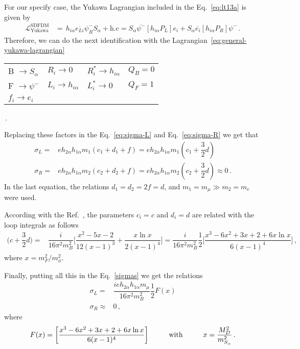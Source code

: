 For our specify case, the Yukawa Lagrangian included in the Eq.~\ref{eq:lt13a} is given by
\begin{align}
\mathcal{L}_{\text{Yukawa}}^{\text{SDFDM}}&=\, h_{i\alpha}\overline{e_{Li}}\psi^-_{R}S_\alpha+ \text{h.c} =S_\alpha\overline{\psi^-}[h_{i\alpha}P_L]e_i + S_\alpha\overline{e_i}[h_{i\alpha}P_R]\psi^- \,.
\end{align}
%
Therefore, we can do the next identification with the Lagrangian~\ref{eq:general-yukawa-lagrangian}
%
\begin{center}
\begin{tabular}{|l|l|l|l|}
\hline
B $\rightarrow S_\alpha$ & $R_i \rightarrow  0$ & $R_i^* \rightarrow  h_{i\alpha}$  & $Q_B=0$\\
F $\rightarrow \psi^-$ & $L_i \rightarrow h_{i\alpha}$ & $L_i^* \rightarrow  0$ &$Q_F=1$ \\
$f_i \rightarrow e_{i}$ &  &  & \\ 
\hline
\end{tabular}\,.
%
\end{center}
Replacing these factors in the Eq.~\eqref{eq:sigma-L} and Eq.~\eqref{eq:sigma-R} we get that
\begin{align}
\sigma_L=&eh_{2\alpha}h_{1\alpha}m_1(c_1+d_1+f)=eh_{2\alpha}h_{1\alpha}m_1(c_1+\dfrac{3}{2}d) \nonumber\\
\sigma_R=&eh_{2\alpha}h_{1\alpha}m_2(c_2+d_2+f)=eh_{2\alpha}h_{1\alpha}m_2(c_2+\dfrac{3}{2}d) \approx 0 \,.
\label{sigmas}
\end{align}
%
In the last equation, the relations $d_1=d_2=2f=d$, and $m_1=m_{\mu} \gg m_2=m_{e} $ were used.

According with the Ref.~\cite{Lavoura:2003xp}, the parameters $c_i=c$ and $d_i=d$ are related with the loop integrals as follows
\begin{align}
\bigg(c+\dfrac{3}{2}d\bigg)=&\dfrac{i}{16\pi^2 m_B^2}\bigg[\dfrac{x^2-5x-2}{12(x-1)^3}+\dfrac{x \ln x}{2(x-1)^4}\bigg]=\dfrac{i}{16\pi^2 m_B^2}\dfrac{1}{2}\bigg[\dfrac{x^3-6x^2+3x+2+6x\ln x}{6(x-1)^4}\bigg]\,,
\end{align}
where $x=m_F^2/m_{\phi}^2 $. 

Finally, putting all this in the Eq.~\eqref{sigmas} we get the relations
\begin{align}
\sigma_L=&\dfrac{i eh_{2\alpha}h_{1\alpha}m_{\mu}}{16\pi^2 m_B^2}\dfrac{1}{2}F(x)\nonumber \\
\sigma_R \approx & 0 \,,
\label{sigmas_result}
\end{align}
where
\begin{align}
F(x)=\bigg[\dfrac{x^3-6x^2+3x+2+6x\ln x}{6(x-1)^4}\bigg] \hspace{1 cm} \text{with} \hspace{1 cm} x=\dfrac{M_D^2}{m_{S_{\alpha}}^2}\,.
\label{Fx}
\end{align}

